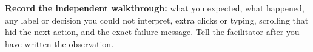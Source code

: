 \documentclass[letterpaper,10pt]{article}
\begin{document}
\begin{note}
\textbf{Record the independent walkthrough:} what you expected, what happened, any label or decision you could not interpret, extra clicks or typing, scrolling that hid the next action, and the exact failure message. Tell the facilitator after you have written the observation.
\end{note}
\end{document}
